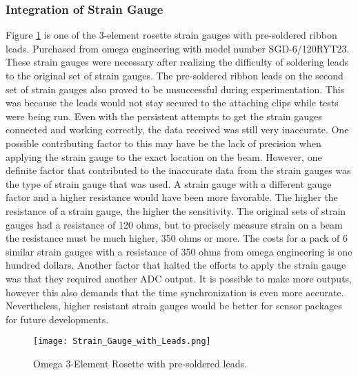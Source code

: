 \subsubsection{Integration of Strain Gauge}

\indent Figure \ref{fig:OmegaSoldered} is one of the 3-element rosette strain gauges with pre-soldered ribbon leads. Purchased from omega engineering with model number SGD-6/120RYT23. These strain gauges were necessary after realizing the difficulty of soldering leads to the original set of strain gauges. The pre-soldered ribbon leads on the second set of strain gauges also proved to be unsuccessful during experimentation. This was because the leads would not stay secured to the attaching clips while tests were being run. Even with the persistent attempts to get the strain gauges connected and working correctly, the data received was still very inaccurate. One possible contributing factor to this may have be the lack of precision when applying the strain gauge to the exact location on the beam. However, one definite factor that contributed to the inaccurate data from the strain gauges was the type of strain gauge that was used. A strain gauge with a different gauge factor and a higher resistance would have been more favorable. The higher the resistance of a strain gauge, the higher the sensitivity. The original sets of strain gauges had a resistance of 120 ohms, but to precisely measure strain on a beam the resistance must be much higher, 350 ohms or more. The costs for a pack of 6 similar strain gauges with a resistance of 350 ohms from omega engineering is one hundred dollars. Another factor that halted the efforts to apply the strain gauge was that they required another ADC output. It is possible to make more outputs, however this also demands that the time synchronization is even more accurate. Nevertheless, higher resistant strain gauges would be better for sensor packages for future developments. \\

\begin{figure}[h]
\centering
\texttt{[image: Strain\_Gauge\_with\_Leads.png]}
\caption{Omega 3-Element Rosette with pre-soldered leads.}
\label{fig:OmegaSoldered}
\end{figure}